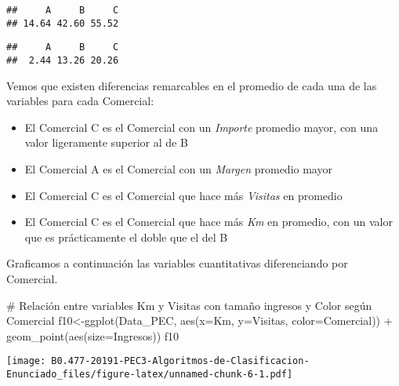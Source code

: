\documentclass[]{article}
\newenvironment{Shaded}{\begin{snugshade}}{\end{snugshade}}
\newcommand{\KeywordTok}[1]{\textcolor[rgb]{0.94,0.87,0.69}{#1}}
\newcommand{\DataTypeTok}[1]{\textcolor[rgb]{0.87,0.87,0.75}{#1}}
\newcommand{\StringTok}[1]{\textcolor[rgb]{0.80,0.58,0.58}{#1}}
\newcommand{\CommentTok}[1]{\textcolor[rgb]{0.50,0.62,0.50}{#1}}
\newcommand{\OperatorTok}[1]{\textcolor[rgb]{0.94,0.94,0.82}{#1}}
\newcommand{\NormalTok}[1]{\textcolor[rgb]{0.80,0.80,0.80}{#1}}
\begin{document}
\begin{verbatim}
##     A     B     C 
## 14.64 42.60 55.52
\end{verbatim}

\begin{Shaded}
\end{Shaded}

\begin{verbatim}
##     A     B     C 
##  2.44 13.26 20.26
\end{verbatim}

Vemos que existen diferencias remarcables en el promedio de cada una de
las variables para cada Comercial:

\begin{itemize}
\item
  El Comercial C es el Comercial con un \emph{Importe} promedio mayor,
  con una valor ligeramente superior al de B\\
\item
  El Comercial A es el Comercial con un \emph{Margen} promedio mayor
\item
  El Comercial C es el Comercial que hace más \emph{Visitas} en promedio
\item
  El Comercial C es el Comercial que hace más \emph{Km} en promedio, con
  un valor que es prácticamente el doble que el del B
\end{itemize}

Graficamos a continuación las variables cuantitativas diferenciando por
Comercial.

\begin{Shaded}
\begin{Highlighting}[]
\CommentTok{# Relación entre variables Km y Visitas con tamaño ingresos y Color según Comercial}
\NormalTok{f10<-}\KeywordTok{ggplot}\NormalTok{(Data_PEC, }\KeywordTok{aes}\NormalTok{(}\DataTypeTok{x=}\NormalTok{Km, }\DataTypeTok{y=}\NormalTok{Visitas, }\DataTypeTok{color=}\NormalTok{Comercial)) }\OperatorTok{+}\StringTok{ }\KeywordTok{geom_point}\NormalTok{(}\KeywordTok{aes}\NormalTok{(}\DataTypeTok{size=}\NormalTok{Ingresos))}
\NormalTok{f10}
\end{Highlighting}
\end{Shaded}

\texttt{[image: B0.477-20191-PEC3-Algoritmos-de-Clasificacion-Enunciado\_files/figure-latex/unnamed-chunk-6-1.pdf]}
\end{document}

